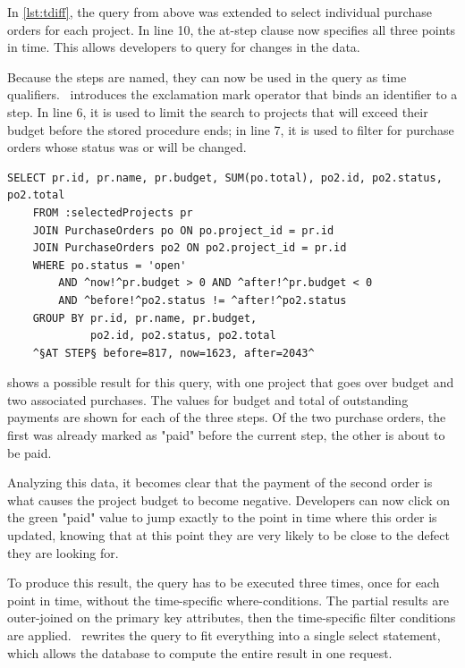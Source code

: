 In \cref{lst:tdiff}, the query from above was extended to select individual purchase orders for each project.
In line 10, the at-step clause now specifies all three points in time.
This allows developers to query for changes in the data.

Because the steps are named, they can now be used in the query as time qualifiers.
\SQLextension\ introduces the exclamation mark operator that binds an identifier to a step.
In line 6, it is used to limit the search to projects that will exceed their budget before the stored procedure ends;
in line 7, it is used to filter for purchase orders whose status was or will be changed.

\begin{lstlisting}[language=HanaSQL,float=t,caption={Example of a time-diff query: "Select all projects that will go over budget and their respective purchase orders"},label=lst:tdiff]
	SELECT pr.id, pr.name, pr.budget, SUM(po.total), po2.id, po2.status, po2.total
	FROM :selectedProjects pr
	JOIN PurchaseOrders po ON po.project_id = pr.id
	JOIN PurchaseOrders po2 ON po2.project_id = pr.id
	WHERE po.status = 'open'
		AND ^now!^pr.budget > 0 AND ^after!^pr.budget < 0
		AND ^before!^po2.status != ^after!^po2.status
	GROUP BY pr.id, pr.name, pr.budget, 
	         po2.id, po2.status, po2.total
	^§AT STEP§ before=817, now=1623, after=2043^
\end{lstlisting}
\timediffresult
{} shows a possible result for this query, with one project that goes over budget and two associated purchases.
The values for budget and total of outstanding payments are shown for each of the three steps.
Of the two purchase orders, the first was already marked as "paid" before the current step, the other is about to be paid.

Analyzing this data, it becomes clear that the payment of the second order is what causes the project budget to become negative.
Developers can now click on the green "paid" value to jump exactly to the point in time where this order is updated, knowing that at this point they are very likely to be close to the defect they are looking for.

To produce this result, the query has to be executed three times, once for each point in time, without the time-specific where-conditions.
The partial results are outer-joined on the primary key attributes, then the time-specific filter conditions are applied.
\tool\ rewrites the query to fit everything into a single select statement, which allows the database to compute the entire result in one request.

